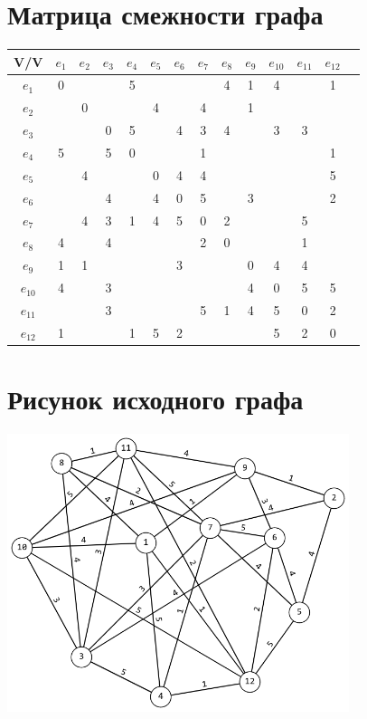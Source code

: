 \documentclass[12pt,a4paper]{report}
\begin{document}
\section*{Матрица смежности графа}
\begin{tabular}{|c|c|c|c|c|c|c|c|c|c|c|c|c|c|}
    \hline
    V/V & $e_{1}$ & $e_{2}$ & $e_{3}$ & $e_{4}$ & $e_{5}$ & $e_{6}$ & $e_{7}$ & $e_{8}$ & $e_{9}$ & $e_{10}$ & $e_{11}$ & $e_{12}$ \\
    \hline
    $e_{1}$  & 0 &   &   & 5 &   &   &   & 4 & 1 & 4 &   & 1 \\
    \hline
    $e_{2}$  &   & 0 &   &   & 4 &   & 4 &   & 1 &   &   &   \\
    \hline
    $e_{3}$  &   &   & 0 & 5 &   & 4 & 3 & 4 &   & 3 & 3 &   \\
    \hline
    $e_{4}$  & 5 &   & 5 & 0 &   &   & 1 &   &   &   &   & 1 \\
    \hline
    $e_{5}$  &   & 4 &   &   & 0 & 4 & 4 &   &   &   &   & 5 \\
    \hline
    $e_{6}$  &   &   & 4 &   & 4 & 0 & 5 &   & 3 &   &   & 2 \\
    \hline
    $e_{7}$  &   & 4 & 3 & 1 & 4 & 5 & 0 & 2 &   &   & 5 &   \\
    \hline
    $e_{8}$  & 4 &   & 4 &   &   &   & 2 & 0 &   &   & 1 &   \\
    \hline
    $e_{9}$  & 1 & 1 &   &   &   & 3 &   &   & 0 & 4 & 4 &   \\
    \hline
    $e_{10}$ & 4 &   & 3 &   &   &   &   &   & 4 & 0 & 5 & 5 \\
    \hline
    $e_{11}$ &   &   & 3 &   &   &   & 5 & 1 & 4 & 5 & 0 & 2 \\
    \hline
    $e_{12}$ & 1 &   &   & 1 & 5 & 2 &   &   &   & 5 & 2 & 0 \\
    \hline
\end{tabular}
\section*{Рисунок исходного графа}
\begin{center}
    \includegraphics*[width=10cm]{graph_1.png}
\end{center}
\newpage
\end{document}
